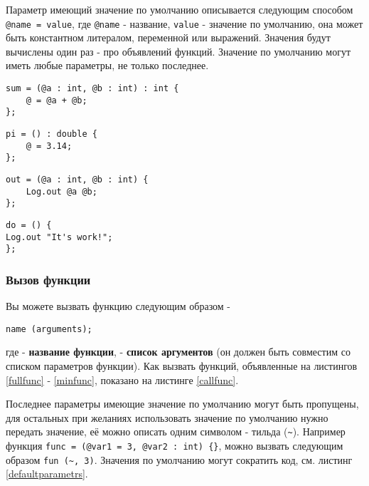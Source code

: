 Параметр имеющий значение по умолчанию описывается следующим способом \lstinline|@name = value|, где \lstinline|@name| - название, \lstinline|value| - значение по умолчанию, она может быть константном литералом, переменной или выражений. Значения будут вычислены один раз - про объявлений функций. Значение по умолчанию могут иметь любые параметры, не только последнее.

\begin{lstlisting}[caption=Полноценная функция, label=fullfunc]
sum = (@a : int, @b : int) : int {
	@ = @a + @b;
};
\end{lstlisting}

\begin{lstlisting}[caption=Функция без аргументов, label=noargsfunc]
pi = () : double {
	@ = 3.14;
};
\end{lstlisting}

\begin{lstlisting}[caption=Функция без типа возвращаемой значений, label=notypefunc]
out = (@a : int, @b : int) {
	Log.out @a @b;
};
\end{lstlisting}

\begin{lstlisting}[caption=Функция без аргументов и тип возвращаемой значений, label=minfunc]
do = () {
Log.out "It's work!";
};
\end{lstlisting}

\subsubsection{Вызов функции}

Вы можете вызвать функцию следующим образом -
\begin{lstlisting}[numbers=none]
name (arguments);
\end{lstlisting}
где  - {\bf название функции},  - {\bf список аргументов} (он должен быть совместим со списком параметров функции). Как вызвать функций, объявленные на листингов \ref{fullfunc} - \ref{minfunc}, показано на листинге \ref{callfunc}. 

Последнее параметры имеющие значение по умолчанию могут быть пропущены, для остальных при желаниях использовать значение по умолчанию нужно передать \void{} значение, её можно описать одним символом - тильда (\lstinline|~|). Например функция \lstinline|func = (@var1 = 3, @var2 : int) {}|, можно вызвать следующим образом \lstinline|fun (~, 3)|. Значения по умолчанию могут сократить код, см. листинг \ref{defaultparametrs}.

